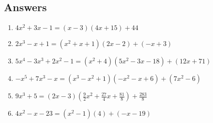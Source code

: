 \documentclass{ximera}
\begin{document}
	\author{Stitz-Zeager}


\subsection{Answers}

\begin{enumerate}
\item $4x^2+3x-1 = (x-3)(4x+15) + 44$
\item $2x^3-x+1 = \left(x^2+x+1\right)(2x-2)+(-x+3)$
\item $5x^{4} - 3x^{3} + 2x^{2} - 1 = \left(x^{2} + 4 \right) \left(5x^{2} - 3x - 18 \right) + (12x + 71)$
\item $-x^{5} + 7x^{3} - x = \left(x^{3} - x^{2} + 1 \right) \left(-x^{2} - x + 6 \right) + \left(7x^{2} - 6 \right)$
\item $9x^{3} + 5 =(2x - 3) \left(\frac{9}{2}x^{2} + \frac{27}{4}x + \frac{81}{8} \right) + \frac{283}{8}$
\item $4x^2 - x - 23 = \left(x^{2} - 1 \right)(4) + (-x - 19)$
\setcounter{HW}{\value{enumi}}
\end{enumerate}
\end{document}
